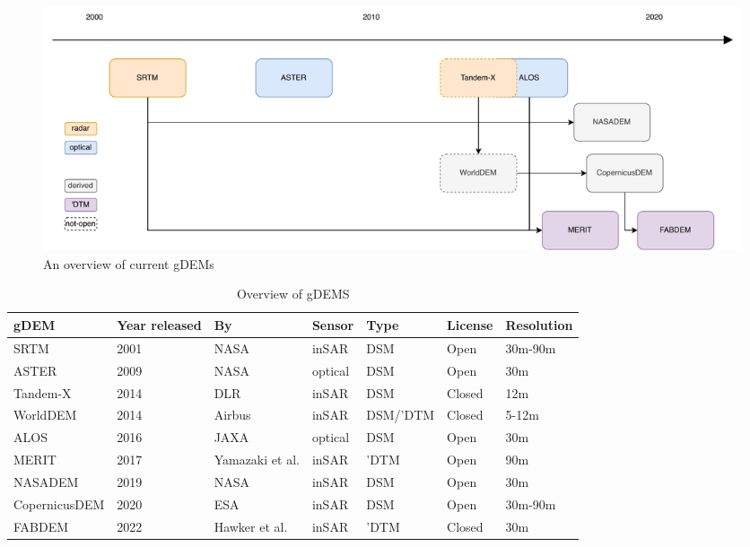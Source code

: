

\begin{figure}
  \centering
  \includegraphics[width=\linewidth]{dems_overview}
  \caption{An overview of current gDEMs}%
\end{figure}

\begin{table}[]
  \begin{tabular}{@{}l|llllll@{}}
    \toprule
    gDEM          & Year released & By              & Sensor  & Type     & License & Resolution \\
    \midrule
    SRTM          & 2001          & NASA            & inSAR   & DSM      & Open    & 30m-90m    \\
    ASTER         & 2009          & NASA            & optical & DSM      & Open    & 30m        \\
    Tandem-X      & 2014          & DLR             & inSAR   & DSM      & Closed  & 12m        \\
    WorldDEM      & 2014          & Airbus          & inSAR   & DSM/'DTM & Closed  & 5-12m      \\
    ALOS          & 2016          & JAXA            & optical & DSM      & Open    & 30m        \\
    MERIT         & 2017          & Yamazaki et al. & inSAR   & 'DTM     & Open    & 90m        \\
    NASADEM       & 2019          & NASA            & inSAR   & DSM      & Open    & 30m        \\
    CopernicusDEM & 2020          & ESA             & inSAR   & DSM      & Open    & 30m-90m    \\
    FABDEM        & 2022          & Hawker et al.   & inSAR   & 'DTM     & Closed  & 30m        \\
    \bottomrule
  \end{tabular}
  \caption{Overview of gDEMS}
  \label{tab:gdem_overview}
\end{table}

